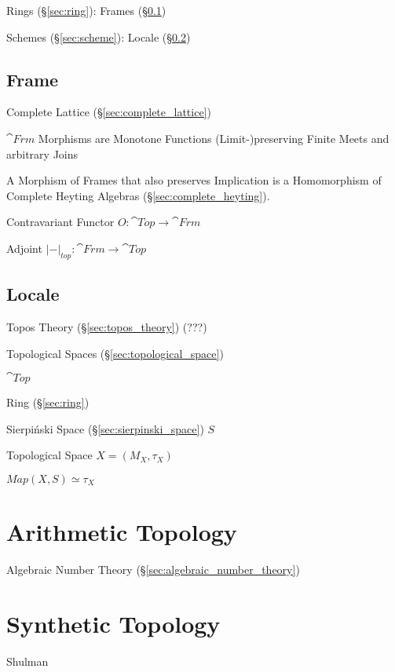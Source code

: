 Rings (\S\ref{sec:ring}): Frames (\S\ref{sec:frame})

Schemes (\S\ref{sec:scheme}): Locale (\S\ref{sec:locale})



\subsection{Frame}\label{sec:frame}

Complete Lattice (\S\ref{sec:complete_lattice})

$\cat{Frm}$ Morphisms are Monotone Functions (Limit-)preserving Finite
Meets and arbitrary Joins

A Morphism of Frames that also preserves Implication is a Homomorphism
of Complete Heyting Algebras (\S\ref{sec:complete_heyting}).

Contravariant Functor $O : \cat{Top} \rightarrow \cat{Frm}$

Adjoint $|-|_{top} : \cat{Frm} \rightarrow \cat{Top}$ %



\subsection{Locale}\label{sec:locale}

Topos Theory (\S\ref{sec:topos_theory}) (???)

Topological Spaces (\S\ref{sec:topological_space})

$\cat{Top}$

Ring (\S\ref{sec:ring})

Sierpi\'nski Space (\S\ref{sec:sierpinski_space}) $S$

Topological Space $X = (M_X,\tau_X)$

$Map(X,S) \simeq \tau_X$



\section{Arithmetic Topology}\label{sec:arithmetic_topology}

Algebraic Number Theory (\S\ref{sec:algebraic_number_theory})



\section{Synthetic Topology}\label{sec:synthetic_topology}

\fist Shulman

